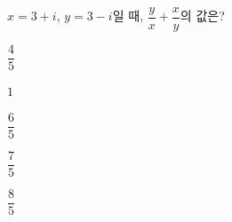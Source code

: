 $x=3+i$, $y=3-i$일 때, $\dfrac{y}{x}+\dfrac{x}{y}$의 값은?
\begin{choices32}{\rule[-3ex]{0pt}{8ex}$\dfrac{4}{5}$}{\rule[-3ex]{0pt}{8ex}$1$}{\rule[-3ex]{0pt}{8ex}$\dfrac{6}{5}$}{\rule[-3ex]{0pt}{8ex}$\dfrac{7}{5}$}{\rule[-3ex]{0pt}{8ex}$\dfrac{8}{5}$}\end{choices32}
